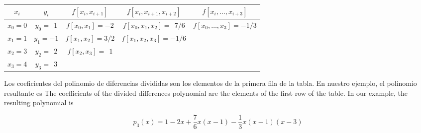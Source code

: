 \begin{table}[h]
\centering
{}
\begin{tabular}{ccccc}
$x_i$&$y_i$&$f\left[x_i,x_{i+1}\right]$&$f\left[x_i,x_{i+1},x_{i+2}\right]$&$f\left[x_i,\dots,x_{i+3}\right]$\\
\hline
$x_0=0$&$y_0=\ \  1$&$f\left[x_0,x_1\right]=-2$&$f\left[x_0,x_1,x_2\right]=\ \ 7/6$&$f\left[x_0,\dots,x_3\right]=-1/3$\\
$x_1=1$&$y_1=-1$&$f\left[x_1,x_2\right]=3/2$&$f\left[x_1,x_2,x_3\right]=-1/6$\\
$x_2=3$&$y_2=\ \ 2$&$f\left[x_2,x_3\right]=\ \ 1$\\
$x_3=4$&$y_3=\ \ 3$\\
\end{tabular}
\label{tabdif}
\end{table}
\begin{paracol}{2}
Los coeficientes del polinomio de diferencias divididas son los elementos de la primera fila de la tabla. En nuestro ejemplo, el polinomio resultante es
\switchcolumn
The coefficients of the divided differences polynomial are the elements of the first row of the table. In our example, the resulting polynomial is
\end{paracol}
\begin{equation*}
p_3(x)=1-2x+\frac{7}{6}x(x-1)-\frac{1}{3}x(x-1)(x-3)
\end{equation*}
